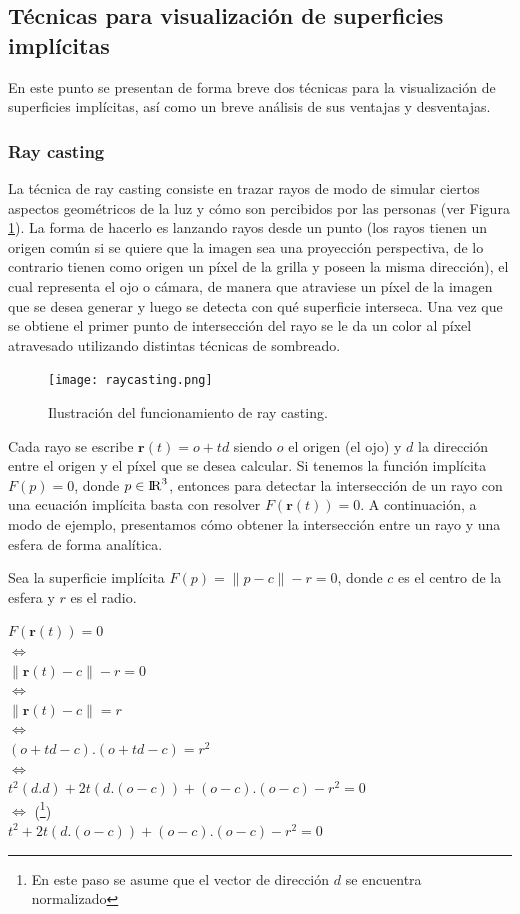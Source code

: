 \documentclass[12pt]{article}
\begin{document}
\subsection{Técnicas para visualización de superficies implícitas}
\noindent En este punto se presentan de forma breve dos técnicas para la visualización de superficies implícitas, así como un breve análisis de sus ventajas y desventajas.
\subsubsection{Ray casting}
\noindent La técnica de ray casting consiste en trazar rayos de modo de simular ciertos aspectos geométricos de la luz y cómo son percibidos por las personas (ver Figura \ref{raycasting}). La forma de hacerlo es lanzando rayos desde un punto (los rayos tienen un origen común si se quiere que la imagen sea una proyección perspectiva, de lo contrario tienen como origen un píxel de la grilla y poseen la misma dirección), el cual representa el ojo o cámara, de manera que atraviese un píxel de la imagen que se desea generar y luego se detecta con qué superficie interseca. Una vez que se obtiene el primer punto de intersección del rayo se le da un color al píxel atravesado utilizando distintas técnicas de sombreado.
\begin{figure}[h!]
\texttt{[image: raycasting.png]}
\caption{Ilustración del funcionamiento de ray casting.}
\label{raycasting}
\end{figure}

Cada rayo se escribe $\textbf{r}(t)= o +td$ siendo $o$ el origen (el ojo) y $d$ la dirección entre el origen y el píxel que se desea calcular. Si tenemos la función implícita $F(p)=0$, donde $p \in {\rm I\!R} ^3 $, entonces para detectar la intersección de un rayo con una ecuación implícita basta con resolver $F(\textbf{r}(t))=0$.
A continuación, a modo de ejemplo, presentamos cómo obtener la intersección entre un rayo y una esfera de forma analítica\cite{realtimerendering}.

Sea la superficie implícita $F(p)=\lVert p -c \rVert - r = 0$, donde $c$ es el centro de la esfera y $r$ es el radio.
\begin{center}
$ F(\textbf{r}(t))= 0$
\\$ \iff$
\\$ \lVert \textbf{r}(t) -c \rVert - r = 0$
\\$ \iff$
\\$ \lVert \textbf{r}(t) -c \rVert = r$
\\ $\iff$
\\ $(o+td -c).(o+td -c) = r^2 $ 
\\ $\iff$
\\$t^2(d.d) + 2t(d.(o-c)) + (o-c).(o-c) - r^2=0$
\\ $\iff$ (\footnote{En este paso se asume que el vector de dirección $d$ se encuentra normalizado})
\\$t^2 + 2t(d.(o-c)) + (o-c).(o-c) - r^2=0$
\end{center}
\end{document}
